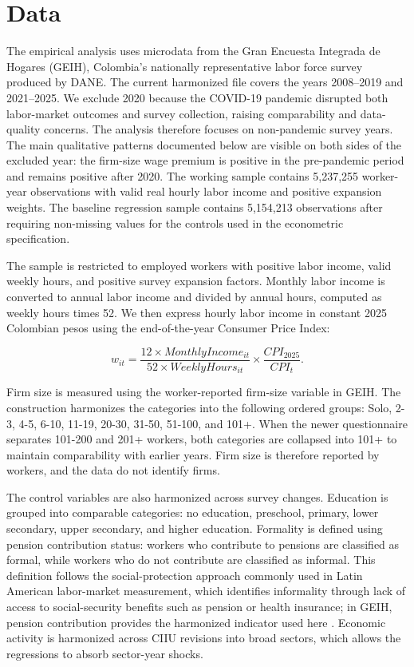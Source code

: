 \section{Data}

The empirical analysis uses microdata from the Gran Encuesta Integrada de Hogares (GEIH), Colombia's nationally representative labor force survey produced by DANE. The current harmonized file covers the years 2008--2019 and 2021--2025. We exclude 2020 because the COVID-19 pandemic disrupted both labor-market outcomes and survey collection, raising comparability and data-quality concerns. The analysis therefore focuses on non-pandemic survey years. The main qualitative patterns documented below are visible on both sides of the excluded year: the firm-size wage premium is positive in the pre-pandemic period and remains positive after 2020. The working sample contains 5,237,255 worker-year observations with valid real hourly labor income and positive expansion weights. The baseline regression sample contains 5,154,213 observations after requiring non-missing values for the controls used in the econometric specification.

The sample is restricted to employed workers with positive labor income, valid weekly hours, and positive survey expansion factors. Monthly labor income is converted to annual labor income and divided by annual hours, computed as weekly hours times 52. We then express hourly labor income in constant 2025 Colombian pesos using the end-of-the-year Consumer Price Index:

\begin{equation}
  w_{it} =
  \frac{12 \times MonthlyIncome_{it}}{52 \times WeeklyHours_{it}}\times
  \frac{CPI_{2025}}{CPI_t}.    
\end{equation}

Firm size is measured using the worker-reported firm-size variable in GEIH. The construction harmonizes the categories into the following ordered groups: Solo, 2-3, 4-5, 6-10, 11-19, 20-30, 31-50, 51-100, and 101+. When the newer questionnaire separates 101-200 and 201+ workers, both categories are collapsed into 101+ to maintain comparability with earlier years. Firm size is therefore reported by workers, and the data do not identify firms.

The control variables are also harmonized across survey changes. Education is grouped into comparable categories: no education, preschool, primary, lower secondary, upper secondary, and higher education. Formality is defined using pension contribution status: workers who contribute to pensions are classified as formal, while workers who do not contribute are classified as informal. This definition follows the social-protection approach commonly used in Latin American labor-market measurement, which identifies informality through lack of access to social-security benefits such as pension or health insurance; in GEIH, pension contribution provides the harmonized indicator used here \citep{WorldBankLACInformality2026}. Economic activity is harmonized across CIIU revisions into broad sectors, which allows the regressions to absorb sector-year shocks.

